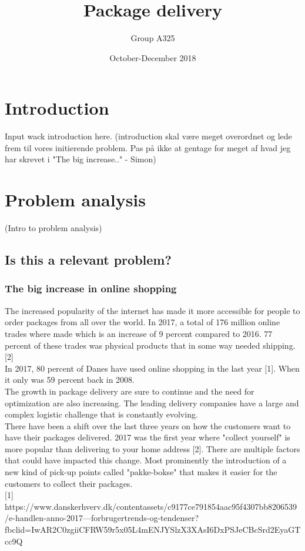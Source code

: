 \documentclass[12pt]{report}
\title{Package delivery}
\author{Group A325}
\date{October-December 2018}
\begin{document}
\maketitle
\chapter{Introduction}
Input wack introduction here. 
(introduction skal være meget overordnet og lede frem til vores initierende problem. Pas på ikke at gentage for meget af hvad jeg har skrevet i "The big increase.." - Simon)

\chapter{Problem analysis}
(Intro to problem analysis)

\section{Is this a relevant problem?}

\subsection{The big increase in online shopping}
The increased popularity of the internet has made it more accessible for people to order packages from all over the world. In 2017, a total of 176 million online trades where made which is an increase of 9 percent compared to 2016. 77 percent of these trades was physical products that in some way needed shipping.[2] \\
In 2017, 80 percent of Danes have used online shopping in the last year [1]. When it only was 59 percent back in 2008. \\
The growth in package delivery are sure to continue and the need for optimization are also increasing. The leading delivery companies have a large and complex logistic challenge that is constantly evolving. \\
There have been a shift over the last three years on how the customers want to have their packages delivered. 2017 was the first year where "collect yourself" is more popular than delivering to your home address [2]. There are multiple factors that could have impacted this change. Most prominently the introduction of a new kind of pick-up points called "pakke-bokse" that makes it easier for the customers to collect their packages. \\


[1] https://www.danskerhverv.dk/contentassets/c9177ce791854aac95f4307bb8206539/e-handlen-anno-2017---forbrugertrends-og-tendenser?fbclid=IwAR2C0zgiiCFRW59r5x05L4mENJYSlzX3XAsI6DxPSJeCBcSrd2EyaGTcc9Q
\end{document}
